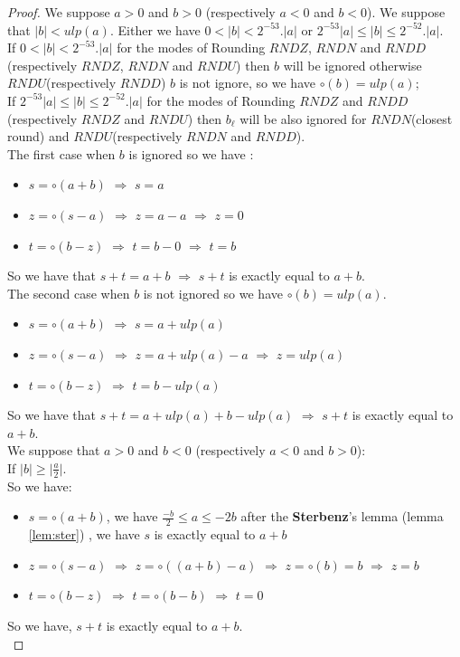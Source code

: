 \begin{proof}
We suppose $a > 0$ and $b > 0$ (respectively  $a < 0$ and $b < 0$).
We suppose that $\lvert b \rvert < ulp(a)$. Either we have $ 0 < \lvert b \rvert < 2^{-53}. \lvert a \rvert $ or  $ 2^{-53} \lvert a  \rvert \le \lvert b \rvert \le  2^{-52}. \lvert a \rvert$.\\
If $ 0 < \lvert b \rvert < 2^{-53}. \lvert a \rvert $ for the modes of Rounding $RNDZ$, $RNDN$ and $RNDD$ (respectively $RNDZ$, $RNDN$ and $RNDU$) then $b$ will be ignored
otherwise $RNDU$(respectively  $RNDD$) $b$ is not ignore, so  we have $\circ (b) =  ulp(a)$;\\
If $ 2^{-53} \lvert a  \rvert \le \lvert b \rvert \le  2^{-52}. \lvert a \rvert$ for the modes of Rounding $RNDZ$ and $RNDD$ (respectively $RNDZ$ and $RNDU$) 
then $b_{\ell}$ will be also ignored  for $RNDN$(closest round) and $RNDU$(respectively $RNDN$ and $RNDD$).\\

The first case when $b$ is ignored so we have :
\begin{itemize}
\item $s = \circ (a+b)$ $\Rightarrow$ $s = a$
\item $z = \circ (s-a)$ $\Rightarrow$ $z = a  - a$  $\Rightarrow$ $z = 0$
\item $t = \circ (b-z)$ $\Rightarrow$ $t = b - 0$  $\Rightarrow$ $t = b$
\end{itemize}
So we have that $s+t = a+b$ $\Rightarrow$ $s+t$ is exactly equal to $a+b$.\\

The second case when $b$ is not ignored so we have $\circ (b) = ulp(a)$.
\begin{itemize}
    \item $s = \circ (a+b)$ $\Rightarrow$ $s = a + ulp(a)$
    \item $z = \circ (s-a)$ $\Rightarrow$ $z = a  + ulp(a) - a$  $\Rightarrow$ $z = ulp(a)$
    \item $t = \circ (b-z)$ $\Rightarrow$ $t = b - ulp(a)$  
\end{itemize}
So we have that $s+t = a+ulp(a)+b-ulp(a)$ $\Rightarrow$ $s+t$ is exactly equal to $a+b$.\\

We suppose that $a >0$ and $b<0$ (respectively $a <0$ and $b>0$):\\
If $\lvert b \rvert \ge \lvert \frac{a}{2} \rvert$.\\
So we have:
\begin{itemize}
    \item $s = \circ (a+b)$, we have $\frac{-b}{2} \le a \le -2b$  after the \textbf{Sterbenz}'s lemma (lemma \ref{lem:ster}) , we have $s$ is exactly equal to $a+b$
    \item $z = \circ (s-a)$ $\Rightarrow$ $z =\circ ((a+b)-a)$ $\Rightarrow$ $z = \circ (b) = b$ $\Rightarrow$ $z=b$
    \item $t= \circ (b-z)$  $\Rightarrow$ $t = \circ (b-b)$ $\Rightarrow$ $t=0$
\end{itemize}
So we have, $s+t$ is exactly equal to $a+b$.\\


\end{proof}
